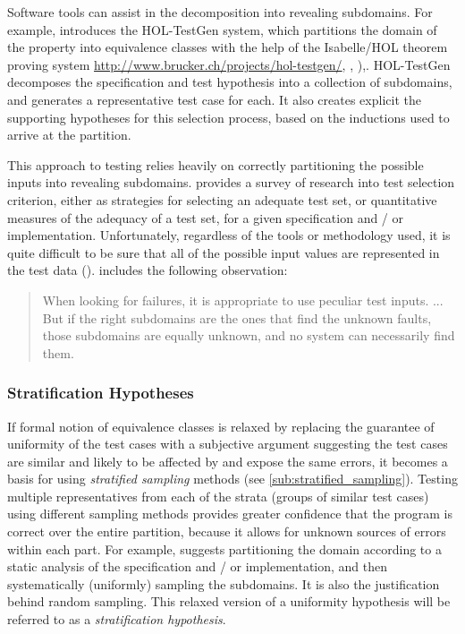 {Software tools can assist in the decomposition into revealing subdomains.
For example, \cite{Brucker2012} introduces the HOL-TestGen system,
which partitions the domain of the property into equivalence classes
with the help of the Isabelle/HOL theorem proving system
\url{http://www.brucker.ch/projects/hol-testgen/}, \cite{HOL-testgen-UG}, \cite{Brucker2009}),.
HOL-TestGen decomposes the specification and test hypothesis 
into a collection of subdomains,
and generates a representative test case for each.
It also creates explicit the supporting hypotheses for this selection process,
based on the inductions used to arrive at the partition.

This approach to testing relies heavily on
correctly partitioning the possible inputs into revealing subdomains.
\cite{ZhuHallMay1997} provides a survey of research into test selection criterion, 
either as strategies for selecting an adequate test set,
or quantitative measures of the adequacy of a test set,
for a given specification and / or implementation.
Unfortunately, regardless of the tools or methodology used,
it is quite difficult to be sure that
all of the possible input values are represented in the test data 
(\cite{Cartwright1981}).
\cite{HamletTaylor1990} includes the following observation:
\begin{quote}
When looking for failures, it is appropriate to use peculiar test inputs. ...
But if the right subdomains are the ones that find the unknown faults,
those subdomains are equally unknown, and no system can necessarily find them.
\end{quote}

\subsubsection{Stratification Hypotheses}\label{sub:stratificationhyp}

If formal notion of equivalence classes is relaxed
by replacing the guarantee of uniformity of the test cases
with a subjective argument suggesting the test cases are similar
and likely to be affected by and expose the same errors,
it becomes a basis for using \emph{stratified sampling} methods 
(see \ref{sub:stratified_sampling}).
Testing multiple representatives from each of the strata (groups of similar test cases)
using different sampling methods provides greater confidence
that the program is correct over the entire partition,
because it allows for unknown sources of errors within each part.
For example, \cite{HamletTaylor1990} suggests 
partitioning the domain according to a static analysis of
the specification and / or implementation, 
and then systematically (uniformly) sampling the subdomains.
It is also the justification behind random sampling.
This relaxed version of a uniformity hypothesis
will be referred to as a \emph{stratification hypothesis}.

}
